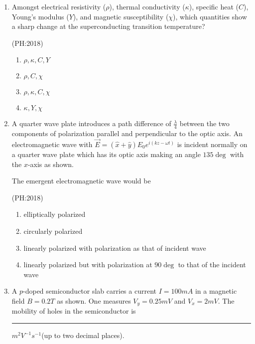 \documentclass[journal,12pt,onecolumn]{IEEEtran}
\theoremstyle{remark}
\begin{document}
\begin{enumerate}
    \hfill{(PH:2018)}
    \begin{multicols}{4}
    \begin{enumerate}
        \item $\frac{2\hbar^2}{W a^2}$
        \item $\frac{\hbar^2}{W a^2}$
        \item $\frac{\hbar^2}{2W a^2}$
        \item $\frac{\hbar^2}{4W a^2}$
    \end{enumerate}
	    \end{multicols}


    \item Amongst electrical resistivity ($\rho$), thermal conductivity ($\kappa$), specific heat ($C$), Young's modulus ($Y$), and magnetic susceptibility ($\chi$), which quantities show a sharp change at the superconducting transition temperature?

    \hfill{(PH:2018)}
    \begin{multicols}{4}
    \begin{enumerate}
        \item $\rho, \kappa, C, Y$
        \item $\rho, C, \chi$
        \item $\rho, \kappa, C, \chi$
        \item $\kappa, Y, \chi$
    \end{enumerate}
	    \end{multicols}
  
  \item	  A quarter wave plate introduces a path difference of $\frac{\lambda}{4}$ between the two components of polarization parallel and perpendicular to the optic axis. An electromagnetic wave with $\overrightarrow{E} = (\hat{x} + \hat{y}) E_0 e^{i(kz - \omega t)} $ is incident normally on a quarter wave plate which has its optic axis making an angle $135\deg$ with the $x$-axis as shown.\\
	  \begin{center}
		  
	  \end{center}
	  The emergent electromagnetic wave would be

	  \hfill{(PH:2018)}
	  \begin{enumerate}
		  \item elliptically polarized
		  \item circularly polarized
		  \item linearly polarized with polarization as that of incident wave
		  \item linearly polarized but with polarization at $90\deg$ to that of the incident wave
	  \end{enumerate}
  \item
	  A $p$-doped semiconductor slab carries a current $I=100mA$ in a magnetic field $B=0.2T$ as shown. One measures $V_y =0.25mV$ and $V_x =2mV$. The mobility of holes in the semiconductor is \rule{2cm}{0.4pt}$m^2 V^{-1} s^{-1}$(up to two decimal places).


\end{enumerate}
\end{document}
